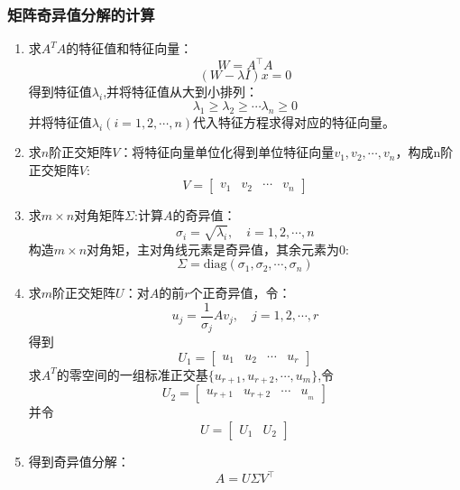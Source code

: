 \documentclass{article}
\begin{document}
\subsubsection{矩阵奇异值分解的计算}
\begin{enumerate}[label = {\Roman*.}]
    \item 求$A^TA$的特征值和特征向量：$$
    W = A^\intercal A
    $$
    $$
    (W-\lambda I)x=0
    $$
    得到特征值$\lambda_i$,并将特征值从大到小排列：
    $$
    \lambda_1\geq\lambda_2\geq\cdots\lambda_n\geq0
    $$
    并将特征值$\lambda_i(i=1,2,\cdots,n)$代入特征方程求得对应的特征向量。
    \item 求$n$阶正交矩阵$V$：将特征向量单位化得到单位特征向量$v_1,v_2,\cdots,v_n$，构成n阶正交矩阵$V$:
    $$
    V = \left[\begin{matrix}v_1&v_2&\cdots&v_n\end{matrix}\right]
    $$
    \item 求$m\times n$对角矩阵$\Sigma$:计算$A$的奇异值：
    $$
    \sigma_i = \sqrt{\lambda_i},\quad i =1,2,\cdots,n
    $$
    构造$m\times n$对角矩，主对角线元素是奇异值，其余元素为0:
    $$
    \Sigma = \text{diag}(\sigma_1,\sigma_2,\cdots,\sigma_n)
    $$
    \item 求$m$阶正交矩阵$U$：对$A$的前$r$个正奇异值，令：
    $$
    u_j = \frac{1}{\sigma_j}Av_j,\quad j = 1,2,\cdots,r
    $$
    得到
    $$
    U_1 = \left[\begin{matrix}u_1&u_2&\cdots&u_r\end{matrix}\right]
    $$
    求$A^T$的零空间的一组标准正交基$\{u_{r+1},u_{r+2},\cdots,u_m\}$,令
    $$
    U_2 = \left[\begin{matrix}u_{r+1}&u_{r+2}&\cdots&u__m\end{matrix}\right]
    $$
    并令
    $$
    U = \left[\begin{matrix}U_1&U_2\end{matrix}\right]
    $$
    \item 得到奇异值分解：
    $$
    A = U\Sigma V^\intercal
    $$
    
    
\end{enumerate}
\end{document}

